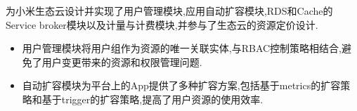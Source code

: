 \documentclass{resume}
\begin{document}


为小米生态云设计并实现了用户管理模块,应用自动扩容模块,RDS和Cache的Service broker模块以及计量与计费模块,并参与了生态云的资源定价设计.
\begin{itemize}
  \item 用户管理模块将用户组作为资源的唯一关联实体,与RBAC控制策略相结合,避免了用户变更带来的资源和权限管理问题.
  \item 自动扩容模块为平台上的App提供了多种扩容方案,包括基于metrics的扩容策略和基于trigger的扩容策略,提高了用户资源的使用效率.
\end{itemize}





\end{document}

